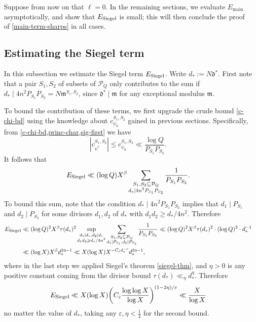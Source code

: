 \documentclass[11pt,reqno]{amsart}
\numberwithin{equation}{section}
\theoremstyle{definition}
\theoremstyle{remark}
\newcommand{\mc}{\mathcal}
\newcommand{\mf}{\mathfrak}
\newcommand{\eps}{\varepsilon}
\renewcommand{\le}{\leqslant}
\renewcommand{\ge}{\geqslant}
\newcommand\siegel{{\textnormal{Siegel}}}
\newcommand\main{{\textnormal{main}}}
\renewcommand\main{\operatorname{main}}
\begin{document}
Suppose from now on that $\ell = 0$. In the remaining sections, we evaluate $E_{\main}$ asymptotically, and show that $E_{\siegel}$ is small; this will then conclude the proof of \cref{main-term-sharps} in all cases.

\subsection{Estimating the Siegel term}


In this subsection we estimate the Siegel term $E_{\siegel}$. Write $d_* := N\mf{d}^*$. First note that a pair $S_1, S_2$ of subsets of $\mc{P}_Q$ only contributes to the sum if $d_* \mid 4n^2 P_{S_1} P_{S_2} = N\mf{m}^{S_1, S_2}$, since $\mf{d}^* \mid \mf{m}$ for any exceptional modulus $\mf{m}$. 

To bound the contribution of these terms, we first upgrade the crude bound \cref{c-chi-bd} using the knowledge about $c^{S_1,S_2}_{\psi_0}$ gained in previous sections. Specifically, from \cref{c-chi-bd,princ-char,sig-first}  we have
\[ |c_{\psi^*}^{S_1, S_2}| \le c_{\psi_0}^{S_1, S_2} \ll \frac{\log Q}{P_{S_1} P_{S_2}}.\] It follows that
\begin{equation}\label{siegel-2} E_{\siegel} \ll (\log Q) X^{\beta}  \sum_{\substack{S_1, S_2 \subseteq \mc{P}_Q \\ d_* \mid 4n^2 P_{S_1} P_{S_2}}} \frac{1}{P_{S_1} P_{S_2}}. \end{equation}
To bound this sum, note that the condition $d_* \mid 4n^2 P_{S_1} P_{S_2}$ implies that $d_1 \mid P_{S_1}$ and $d_2 \mid P_{S_2}$ for some divisors $d_1, d_2$ of $d_*$ with $d_1 d_2 \ge d_*/4n^2$. Therefore 
\begin{align*} E_{\siegel} &\ll (\log Q)^2 X^{\beta} \tau(d_*)^2  \sup_{\substack{d_1|d_{\ast}, d_2|d_{\ast}\\d_1d_2\ge d_*/4n^2}}\sum_{\substack{S_1, S_2 \subseteq\mc{P}_Q \\ d_1 \mid P_{S_1}, d_2 \mid P_{S_2}}} \frac{1}{P_{S_1} P_{S_2}} \ll (\log Q)^2 X^{\beta} \tau(d_*)^2 \cdot (\log Q)^2 \cdot d_{\ast}^{-1}\\ & \ll (\log X) X^{\beta} d_*^{2\eta -1} \ll X (\log X) X^{-C_{\eps} d_*^{-\eps}} d_*^{2\eta -1},\end{align*}
where in the last step we applied Siegel's theorem \cref{siegel-thm}, and $\eta > 0$ is any positive constant coming from the divisor bound $\tau(d_*) \ll_{\eta} d_*^{\eta}$.
Therefore 
\begin{equation}\label{final-seigel} E_{\siegel} \ll X (\log X) \bigg(C_{\eps} \frac{\log \log X}{\log X} \bigg)^{(1 - 2\eta)/\eps} \ll \frac{X}{\log X}\end{equation} no matter the value of $d_*$, taking any $\eps,\eta < \frac{1}{4}$ for the second bound. 
\end{document}
